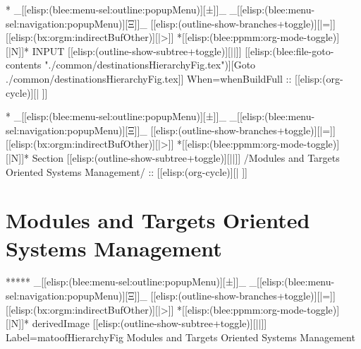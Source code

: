 \begin{whenOrg}
\begin{whenOrg}
*  _[[elisp:(blee:menu-sel:outline:popupMenu)][±]]_ _[[elisp:(blee:menu-sel:navigation:popupMenu)][Ξ]]_ [[elisp:(outline-show-branches+toggle)][|=]] [[elisp:(bx:orgm:indirectBufOther)][|>]] *[[elisp:(blee:ppmm:org-mode-toggle)][|N]]*  INPUT      [[elisp:(outline-show-subtree+toggle)][||]]   [[elisp:(blee:file-goto-contents "./common/destinationsHierarchyFig.tex")][Goto ./common/destinationsHierarchyFig.tex]] When=whenBuildFull ::  [[elisp:(org-cycle)][| ]]
\end{whenOrg}
\begin{whenBuildFull}

\end{whenBuildFull}


\begin{whenOrg}
*  _[[elisp:(blee:menu-sel:outline:popupMenu)][±]]_ _[[elisp:(blee:menu-sel:navigation:popupMenu)][Ξ]]_ [[elisp:(outline-show-branches+toggle)][|=]] [[elisp:(bx:orgm:indirectBufOther)][|>]] *[[elisp:(blee:ppmm:org-mode-toggle)][|N]]*  Section    [[elisp:(outline-show-subtree+toggle)][||]]   /Modules and Targets Oriented Systems Management/ ::  [[elisp:(org-cycle)][| ]]
\end{whenOrg}

\section{Modules and Targets Oriented Systems Management}


\begin{whenOrg}
*****  _[[elisp:(blee:menu-sel:outline:popupMenu)][±]]_ _[[elisp:(blee:menu-sel:navigation:popupMenu)][Ξ]]_ [[elisp:(outline-show-branches+toggle)][|=]] [[elisp:(bx:orgm:indirectBufOther)][|>]] *[[elisp:(blee:ppmm:org-mode-toggle)][|N]]*  derivedImage [[elisp:(outline-show-subtree+toggle)][||]] Label=matoofHierarchyFig Modules and Targets Oriented Systems Management
\end{whenOrg}


\end{whenOrg}
